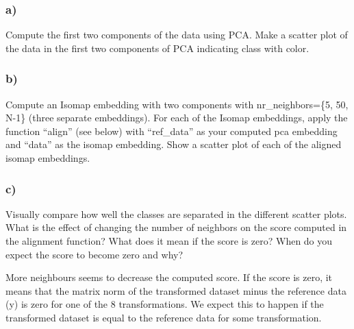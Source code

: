 \documentclass[11pt]{article}
\begin{document}
\hypertarget{a}{%
\subsubsection{a)}\label{a}}

Compute the first two components of the data using PCA. Make a scatter
plot of the data in the first two components of PCA indicating class
with color.

\hypertarget{b}{%
\subsubsection{b)}\label{b}}

Compute an Isomap embedding with two components with nr\_neighbors=\{5,
50, N-1\} (three separate embeddings). For each of the Isomap
embeddings, apply the function ``align'' (see below) with ``ref\_data''
as your computed pca embedding and ``data'' as the isomap embedding.
Show a scatter plot of each of the aligned isomap embeddings.

\hypertarget{c}{%
\subsubsection{c)}\label{c}}

Visually compare how well the classes are separated in the different
scatter plots. What is the effect of changing the number of neighbors on
the score computed in the alignment function? What does it mean if the
score is zero? When do you expect the score to become zero and why?

More neighbours seems to decrease the computed score. If the score is
zero, it means that the matrix norm of the transformed dataset minus the
reference data (y) is zero for one of the 8 transformations. We expect
this to happen if the transformed dataset is equal to the reference data
for some transformation.
\end{document}
